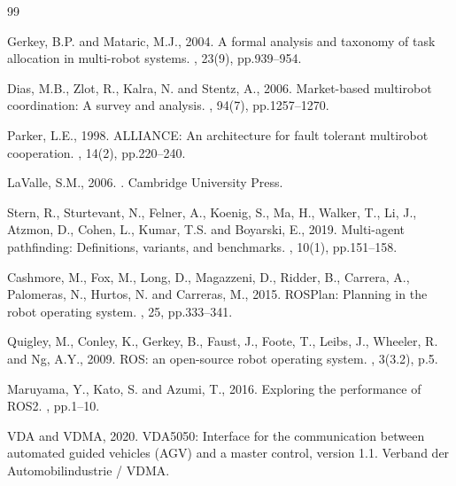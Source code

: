 \documentclass[a4paper,fleqn]{cas-dc}
\begin{document}
\begin{thebibliography}{99}

Gerkey, B.P. and Mataric, M.J., 2004.
\newblock A formal analysis and taxonomy of task allocation in multi-robot systems.
, 23(9), pp.939--954.

Dias, M.B., Zlot, R., Kalra, N. and Stentz, A., 2006.
\newblock Market-based multirobot coordination: A survey and analysis.
, 94(7), pp.1257--1270.

Parker, L.E., 1998.
\newblock ALLIANCE: An architecture for fault tolerant multirobot cooperation.
, 14(2), pp.220--240.

LaValle, S.M., 2006.
.
\newblock Cambridge University Press.

Stern, R., Sturtevant, N., Felner, A., Koenig, S., Ma, H., Walker, T., Li, J., Atzmon, D., Cohen, L., Kumar, T.S. and Boyarski, E., 2019.
\newblock Multi-agent pathfinding: Definitions, variants, and benchmarks.
, 10(1), pp.151--158.

Cashmore, M., Fox, M., Long, D., Magazzeni, D., Ridder, B., Carrera, A., Palomeras, N., Hurtos, N. and Carreras, M., 2015.
\newblock ROSPlan: Planning in the robot operating system.
, 25, pp.333--341.

Quigley, M., Conley, K., Gerkey, B., Faust, J., Foote, T., Leibs, J., Wheeler, R. and Ng, A.Y., 2009.
\newblock ROS: an open-source robot operating system.
, 3(3.2), p.5.

Maruyama, Y., Kato, S. and Azumi, T., 2016.
\newblock Exploring the performance of ROS2.
, pp.1--10.

VDA and VDMA, 2020.
\newblock VDA5050: Interface for the communication between automated guided vehicles (AGV) and a master control, version 1.1.
\newblock Verband der Automobilindustrie / VDMA.


\end{thebibliography}
\end{document}

